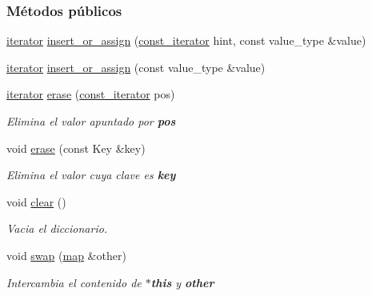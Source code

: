 \subsubsection*{\-Métodos públicos}
\begin{DoxyCompactItemize}
\item 
\hyperlink{classaed2_1_1iterator_1_1iterator}{iterator} \hyperlink{classaed2_1_1iterator_aab34e7001b3ee3ce79da8ea24d7e6351_aab34e7001b3ee3ce79da8ea24d7e6351}{insert\-\_\-or\-\_\-assign} (\hyperlink{classaed2_1_1iterator_1_1const__iterator}{const\-\_\-iterator} hint, const value\-\_\-type \&value)
\item 
\hyperlink{classaed2_1_1iterator_1_1iterator}{iterator} \hyperlink{classaed2_1_1iterator_af131c4b0d89978372a0c8ce38bf8f33e_af131c4b0d89978372a0c8ce38bf8f33e}{insert\-\_\-or\-\_\-assign} (const value\-\_\-type \&value)
\item 
\hyperlink{classaed2_1_1iterator_1_1iterator}{iterator} \hyperlink{classaed2_1_1iterator_adf371aaec9e68bd4a4d5a889d0b6b679_adf371aaec9e68bd4a4d5a889d0b6b679}{erase} (\hyperlink{classaed2_1_1iterator_1_1const__iterator}{const\-\_\-iterator} pos)
\begin{DoxyCompactList}\small\item\em \-Elimina el valor apuntado por {\bfseries pos} \end{DoxyCompactList}\item 
void \hyperlink{classaed2_1_1iterator_a0a0e62b2a2c0fb98f431164c66a6e388_a0a0e62b2a2c0fb98f431164c66a6e388}{erase} (const \-Key \&key)
\begin{DoxyCompactList}\small\item\em \-Elimina el valor cuya clave es {\bfseries key} \end{DoxyCompactList}\item 
void \hyperlink{classaed2_1_1iterator_ac98b533e402839c99d33d3118906c38f_ac98b533e402839c99d33d3118906c38f}{clear} ()
\begin{DoxyCompactList}\small\item\em \-Vacia el diccionario. \end{DoxyCompactList}\item 
void \hyperlink{classaed2_1_1iterator_a8ec2215b2dfaf6ddd57b1e0b00d8d3d2_a8ec2215b2dfaf6ddd57b1e0b00d8d3d2}{swap} (\hyperlink{classaed2_1_1map}{map} \&other)
\begin{DoxyCompactList}\small\item\em \-Intercambia el contenido de {\bfseries $\ast$this} y {\bfseries other} \end{DoxyCompactList}\end{DoxyCompactItemize}
